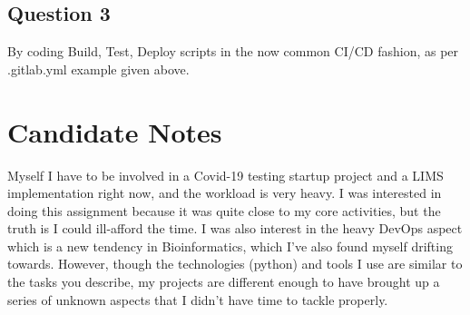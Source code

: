 \documentclass[14pt]{article}
\begin{document}
\subsection*{Question 3}

By coding Build, Test, Deploy scripts in the now common CI/CD fashion, as per .gitlab.yml example given above.

\section*{Candidate Notes}

Myself I have to be involved in a Covid-19 testing startup project and a LIMS implementation right now, and the workload is very heavy. I was interested in doing this assignment because it was quite close to my core activities, but the truth is I could ill-afford the time. I was also interest in the heavy DevOps aspect which is a new tendency in Bioinformatics, which I've also found myself drifting towards. However, though the technologies (python) and tools I use are similar to the tasks you describe, my projects are different enough to have brought up a series of unknown aspects that I didn't have time to tackle properly.
\end{document}
